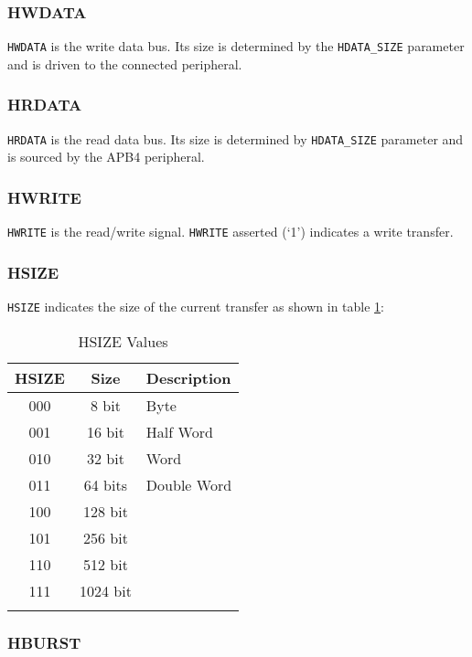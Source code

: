 \subsubsection{HWDATA}

\texttt{HWDATA} is the write data bus. Its size is determined by the
\texttt{HDATA\_SIZE} parameter and is driven to the connected
peripheral.

\subsubsection{HRDATA}

\texttt{HRDATA} is the read data bus. Its size is determined by
\texttt{HDATA\_SIZE} parameter and is sourced by the APB4 peripheral.

\subsubsection{HWRITE}

\texttt{HWRITE} is the read/write signal. \texttt{HWRITE} asserted (`1')
indicates a write transfer.

\subsubsection{HSIZE}

\texttt{HSIZE} indicates the size of the current transfer as shown in table \ref{tab:HSIZE}:

\begin{table}[h]
	\begin{tabular*}{0.5\textwidth}{@{\extracolsep{\fill}}ccl}	
		\thickhline 
		\textbf{HSIZE} & \textbf{Size} & \textbf{Description}\\
		\hline 
		000 & 8 bit & Byte\\
		001 & 16 bit & Half Word\\
		010 & 32 bit & Word\\
		011 & 64 bits & Double Word\\
		100 & 128 bit &\\
		101 & 256 bit &\\
		110 & 512 bit &\\
		111 & 1024 bit &\\
		\thickhline 	
	\end{tabular*} 
	\caption{HSIZE Values}
	\label{tab:HSIZE}
\end{table}

\subsubsection{HBURST}

